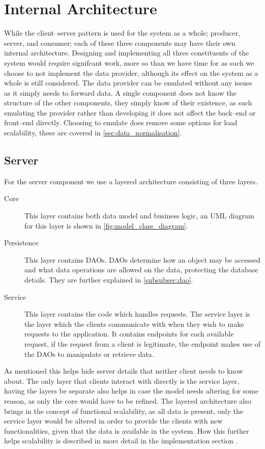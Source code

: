 \section{Internal Architecture}\label{sec:internal_architecture}
While the client--server pattern is used for the system as a whole; producer, server, and consumer; each of these three components may have their own internal architecture.
Designing and implementing all three constituents of the system would require signifcant work, more so than we have time for as such we choose to not implement the data provider, although its effect on the system as a whole is still considered.
The data provider can be emulated without any issues as it simply needs to forward data.
A single component does not know the structure of the other components, they simply know of their existence, as such emulating the provider rather than developing it does not affect the back--end or front--end directly.
Choosing to emulate does remove some options for load scalability, these are covered in \cref{sec:data_normalisation}.

\subsection{Server}
For the server component we use a layered architecture consisting of three layers.
\begin{description}
    \item [Core] This layer contains both data model and business logic, an UML diagram for this layer is shown in \cref{fig:model_class_diagram}.
    \item [Persistence] This layer contains \aclp{DAO}.
    \acsp{DAO} determine how an object may be accessed and what data operations are allowed on the data, protecting the database details.
    They are further explained in \cref{subsubsec:dao}.
    \item [Service] This layer contains the code which handles requests.
    The service layer is the layer which the clients communicate with when they wish to make requests to the application.
    It contains endpoints for each available request, if the request from a client is legitimate, the endpoint makes use of the \acsp{DAO} to manipulate or retrieve data.
\end{description}
As mentioned this helps hide server details that neither client needs to know about.
The only layer that clients interact with directly is the service layer, having the layers be separate also helps in case the model needs altering for some reason, as only the core would have to be refined.
The layered architecture also brings in the concept of functional scalability, as all data is present, only the service layer would be altered in order to provide the clients with new functionalities, given that the data is available in the system.
How this further helps scalability is described in more detail in the implementation section .

